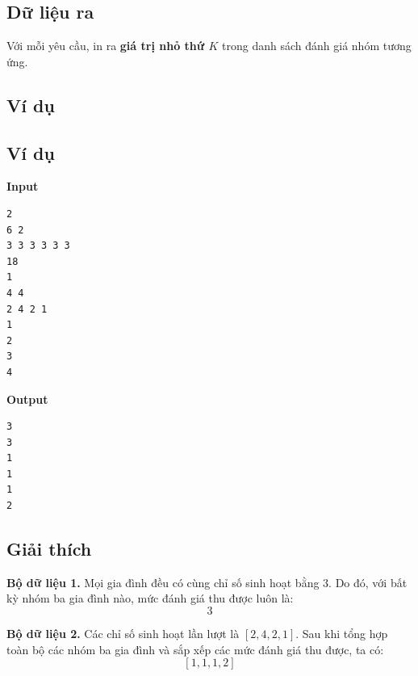 \subsection*{Dữ liệu ra}

Với mỗi yêu cầu, in ra \textbf{giá trị nhỏ thứ $K$}
trong danh sách đánh giá nhóm tương ứng.

\subsection*{Ví dụ}

\subsection*{Ví dụ}

\noindent
\begin{minipage}[t]{0.48\textwidth}
\textbf{Input}
\begin{verbatim}
2
6 2
3 3 3 3 3 3
18
1
4 4
2 4 2 1
1
2
3
4
\end{verbatim}
\end{minipage}
\hfill
\begin{minipage}[t]{0.48\textwidth}
\textbf{Output}
\begin{verbatim}
3
3
1
1
1
2
\end{verbatim}
\end{minipage}


\subsection*{Giải thích}

\textbf{Bộ dữ liệu 1.}
Mọi gia đình đều có cùng chỉ số sinh hoạt bằng $3$.
Do đó, với bất kỳ nhóm ba gia đình nào,
mức đánh giá thu được luôn là:
\[
3
\]

\textbf{Bộ dữ liệu 2.}
Các chỉ số sinh hoạt lần lượt là $[2,4,2,1]$.
Sau khi tổng hợp toàn bộ các nhóm ba gia đình
và sắp xếp các mức đánh giá thu được, ta có:
\[
[1,1,1,2]
\]